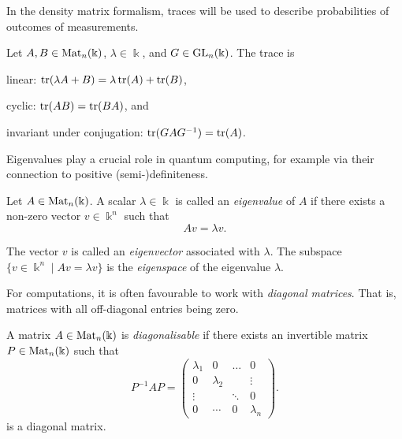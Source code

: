\documentclass[a4paper, oneside, 12pt]{amsart}
\begin{document}
In the density matrix formalism, traces will be used to describe probabilities of outcomes of measurements.

\begin{proposition}\label{prop:basic-properties-of-trace}
  Let \(A, B\in \operatorname{Mat}_{n}( \Bbbk)\), \(\lambda \in \Bbbk\), and \(G \in \operatorname{GL}_{n}( \Bbbk)\).
  The trace  is
  \begin{thmlist}
    \item linear:  \(\operatorname{tr}(\lambda A + B) = \lambda \operatorname{tr}(A) + \operatorname{tr}(B)\),
    \item cyclic: \(\operatorname{tr}(AB) = \operatorname{tr}(BA)\), and
    \item invariant under conjugation: \(\operatorname{tr}(GAG^{-1}) = \operatorname{tr}(A)\).
  \end{thmlist}
\end{proposition}

Eigenvalues play a crucial role in quantum computing, for example via their connection to positive (semi-)definiteness.

\begin{definition}\label{def:eigenvalue-and-eigenspace}
  Let \( A \in \operatorname{Mat}_{n}(\Bbbk) \). A scalar \( \lambda \in \Bbbk \) is called an \emph{eigenvalue} of \( A \) if there exists a non-zero vector \( v \in \Bbbk^n \) such that
  \begin{equation}
    A v = \lambda v.
  \end{equation}

  The vector \( v \) is called an \emph{eigenvector} associated with \( \lambda \).
  The subspace \(\{v\in \Bbbk^{n} \mid Av = \lambda v\}\) is the \emph{eigenspace} of the eigenvalue \( \lambda \).
\end{definition}

For computations, it is often favourable to work with \emph{diagonal matrices}.
That is, matrices with all off-diagonal entries being zero.

\begin{definition}\label{def:diagonalisable}
  A matrix \( A \in \operatorname{Mat}_{n}(\Bbbk) \) is \emph{diagonalisable} if there exists an invertible matrix \( P \in \operatorname{Mat}_{n}(\Bbbk) \) such that
  \begin{equation*}
    P^{-1} A P =
    \begin{pmatrix}
      \lambda_1 & 0 & \dots & 0 \\
      0 & \lambda_2 & & \vdots \\
      \vdots & & \ddots & 0 \\
      0 & \cdots & 0 & \lambda_n
    \end{pmatrix}.
  \end{equation*}
  is a diagonal matrix.
\end{definition}
\end{document}
